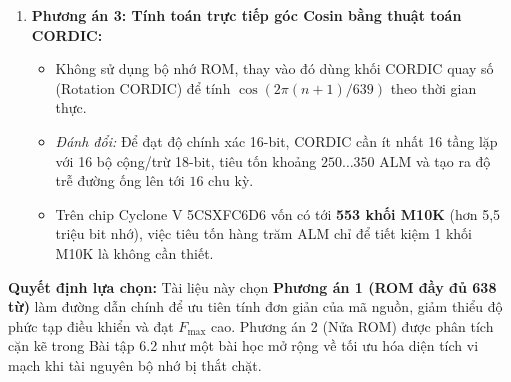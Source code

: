 \begin{enumerate}[leftmargin=1.5em, itemsep=3pt]
    \item \textbf{Phương án 3: Tính toán trực tiếp góc Cosin bằng thuật toán CORDIC:}
    \begin{itemize}[leftmargin=1.5em, itemsep=1pt]
        \item Không sử dụng bộ nhớ ROM, thay vào đó dùng khối CORDIC quay số (Rotation CORDIC) để tính $\cos(2\pi (n+1)/639)$ theo thời gian thực.
        \item \emph{Đánh đổi:} Để đạt độ chính xác 16-bit, CORDIC cần ít nhất 16 tầng lặp với 16 bộ cộng/trừ 18-bit, tiêu tốn khoảng $250 \dots 350\text{ ALM}$ và tạo ra độ trễ đường ống lên tới $16\text{ chu kỳ}$.
        \item Trên chip Cyclone V 5CSXFC6D6 vốn có tới \textbf{553 khối M10K} (hơn 5,5 triệu bit nhớ), việc tiêu tốn hàng trăm ALM chỉ để tiết kiệm 1 khối M10K là không cần thiết.
    \end{itemize}
\end{enumerate}

\textbf{Quyết định lựa chọn:} Tài liệu này chọn \textbf{Phương án 1 (ROM đầy đủ 638 từ)} làm đường dẫn chính để ưu tiên tính đơn giản của mã nguồn, giảm thiểu độ phức tạp điều khiển và đạt $F_{\max}$ cao. Phương án 2 (Nửa ROM) được phân tích cặn kẽ trong Bài tập 6.2 như một bài học mở rộng về tối ưu hóa diện tích vi mạch khi tài nguyên bộ nhớ bị thắt chặt.

